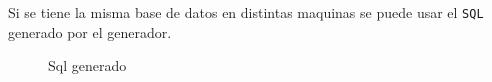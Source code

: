 Si se tiene la misma base de datos en distintas maquinas se puede usar el \texttt{SQL} generado por el generador.
\begin{figure}[H]
\caption{Sql generado}\label{fig:sqlGenerated}
\centering
{}
\end{figure}





